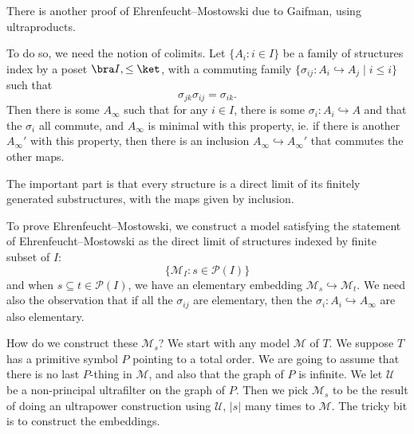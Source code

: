 \documentclass[a4paper]{article}
\begin{document}
There is another proof of Ehrenfeucht--Mostowski due to Gaifman, using ultraproducts.

To do so, we need the notion of colimits. Let $\{A_i: i \in I\}$ be a family of structures index by a poset $\bra I, \leq\ket$, with a commuting family $\{\sigma_{ij}: A_i \hookrightarrow A_j \mid i \leq i\}$ such that
\[
  \sigma_{jk} \sigma_{ij} = \sigma_{ik}.
\]
Then there is some $A_\infty$ such that for any $i \in I$, there is some $\sigma_i: A_i \hookrightarrow A$ and that the $\sigma_i$ all commute, and $A_\infty$ is minimal with this property, ie. if there is another $A_\infty '$ with this property, then there is an inclusion $A_\infty \hookrightarrow A_\infty'$ that commutes the other maps.

The important part is that every structure is a direct limit of its finitely generated substructures, with the maps given by inclusion.

To prove Ehrenfeucht--Mostowski, we construct a model satisfying the statement of Ehrenfeucht--Mostowski as the direct limit of structures indexed by finite subset of $I$:
\[
  \{\mathcal{M}_I: s \in \mathcal{P}(I)\}
\]
and when $s \subseteq t \in \mathcal{P}(I)$, we have an elementary embedding $\mathcal{M}_s \hookrightarrow \mathcal{M}_t$. We need also the observation that if all the $\sigma_{ij}$ are elementary, then the $\sigma_i: A_i \hookrightarrow A_\infty$ are also elementary.

How do we construct these $\mathcal{M}_s$? We start with any model $\mathcal{M}$ of $T$. We suppose $T$ has a primitive symbol $P$ pointing to a total order. We are going to assume that there is no last $P$-thing in $\mathcal{M}$, and also that the graph of $P$ is infinite. We let $\mathcal{U}$ be a non-principal ultrafilter on the graph of $P$. Then we pick $\mathcal{M}_s$ to be the result of doing an ultrapower construction using $\mathcal{U}$, $|s|$ many times to $\mathcal{M}$. The tricky bit is to construct the embeddings.
\end{document}
